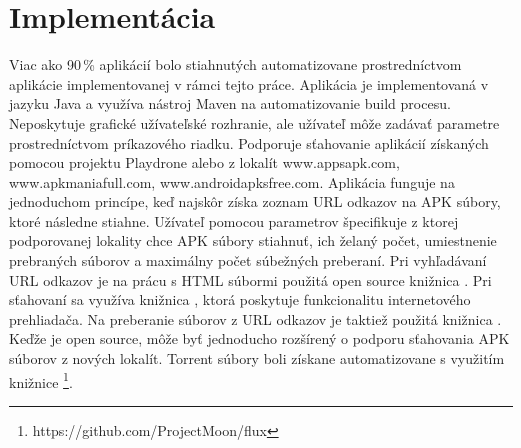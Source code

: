 \section{Implementácia}
Viac ako 90\,\% aplikácií bolo stiahnutých automatizovane prostredníctvom aplikácie  implementovanej v rámci tejto práce. Aplikácia je implementovaná v jazyku Java a využíva nástroj Maven na automatizovanie build procesu. Neposkytuje grafické užívateľské rozhranie, ale užívateľ môže zadávať parametre prostredníctvom príkazového riadku. Podporuje sťahovanie aplikácií získaných pomocou projektu Playdrone alebo z lokalít www.appsapk.com, www.apkmaniafull.com, www.androidapksfree.com. Aplikácia funguje na jednoduchom princípe, keď najskôr získa zoznam URL odkazov na APK súbory, ktoré následne stiahne. Užívateľ pomocou parametrov špecifikuje z ktorej podporovanej lokality chce APK súbory stiahnuť, ich želaný počet, umiestnenie prebraných súborov a maximálny počet súbežných preberaní.  Pri vyhľadávaní URL odkazov je na prácu s HTML súbormi použitá open source knižnica . Pri sťahovaní sa využíva knižnica , ktorá poskytuje funkcionalitu internetového prehliadača. Na preberanie súborov z URL odkazov je taktiež použitá knižnica . Keďže je  open source, môže byť jednoducho rozšírený o podporu sťahovania APK súborov z nových lokalít.
Torrent súbory boli získane automatizovane s využitím knižnice \footnote{https://github.com/ProjectMoon/flux}.
